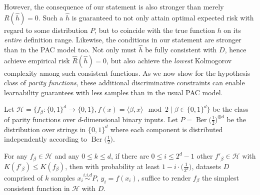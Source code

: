 However, the consequence of our statement is also stronger than merely $R(\hat{h})=0$.
Such a $\hat{h}$ is guaranteed to not only attain optimal expected risk with regard to some distribution $P$, but to coincide with the true function $h$ on its \textit{entire} definition range. 
Likewise, the conditions in our statement are stronger than in the PAC model too.
Not only must $\hat{h}$ be fully consistent with $D$, hence achieve empirical risk $\hat{R}(\hat{h})=0$, but also achieve the \textit{lowest} Kolmogorov complexity among such consistent functions.
As we now show for the hypothesis class of \textit{parity functions}, these additional discriminative constraints can enable learnability guarantees with less samples than in the usual PAC model.
\begin{lemma}
	\label{lemma:sufficient-sample-size-parity-functions}
	Let $\mathcal{H}=\bigl\{f_\beta:\{0,1\}^{d}\to \{0,1\}, f(x)=\langle \beta, x \rangle \mod 2\mid \beta\in\{0,1\}^{d}\bigr\}$ be the class of parity functions over $d$-dimensional binary inputs.
	Let $P=\operatorname{Ber}\bigl(\frac{1}{2}\bigr)^{\otimes d}$ be the distribution over strings in $\{0,1\}^{d}$ where each component is distributed independently according to $\operatorname{Ber}\bigl(\frac{1}{2}\bigr)$.
	
	For any $f_\beta\in\mathcal{H}$ and any $0\leq k\leq d$, if there are $0\leq i\leq 2^d-1$ other $f'_\beta\in\mathcal{H}$ with $K(f'_\beta)\leq K(f_\beta)$, then with probability at least $1-i\cdot\bigl(\frac{1}{2^k}\bigr)$, datasets $D$ comprised of $k$ samples $x_i\overset{i.i.d}{\sim}P$, $y_i=f(x_i)$, suffice to render $f_\beta$ the simplest consistent function in $\mathcal{H}$ with $D$.
	
\end{lemma}
